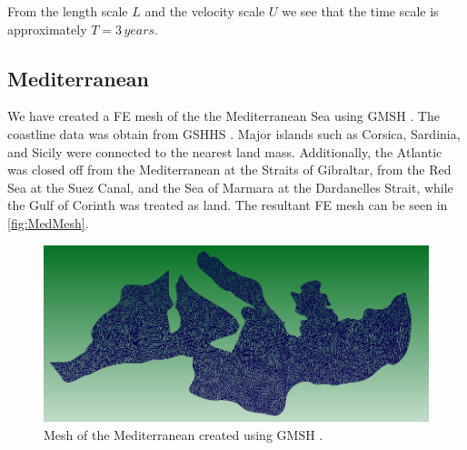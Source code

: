 From the length scale $L$ and the velocity scale $U$ we see that the time scale
is approximately $T = 3\, years$.

\subsection{Mediterranean}
We have created a FE mesh of the the Mediterranean Sea using GMSH \cite{GMSH}.
The coastline data was obtain from GSHHS \cite{GSHHS}. Major islands such as
Corsica, Sardinia, and Sicily were connected to the nearest land mass.
Additionally, the Atlantic was closed off from the Mediterranean at the Straits
of Gibraltar, from the Red Sea at the Suez Canal, and the Sea of Marmara at the
Dardanelles Strait, while the Gulf of Corinth was treated as land. The resultant FE
mesh can be seen in \autoref{fig:MedMesh}.

\begin{figure}
  \begin{center}
    \includegraphics[scale=0.5]{Figures/MediterraneanMesh.png}
    \caption{Mesh of the Mediterranean created using GMSH \cite{GMSH}.}
    \label{fig:MedMesh}
  \end{center}
\end{figure}

